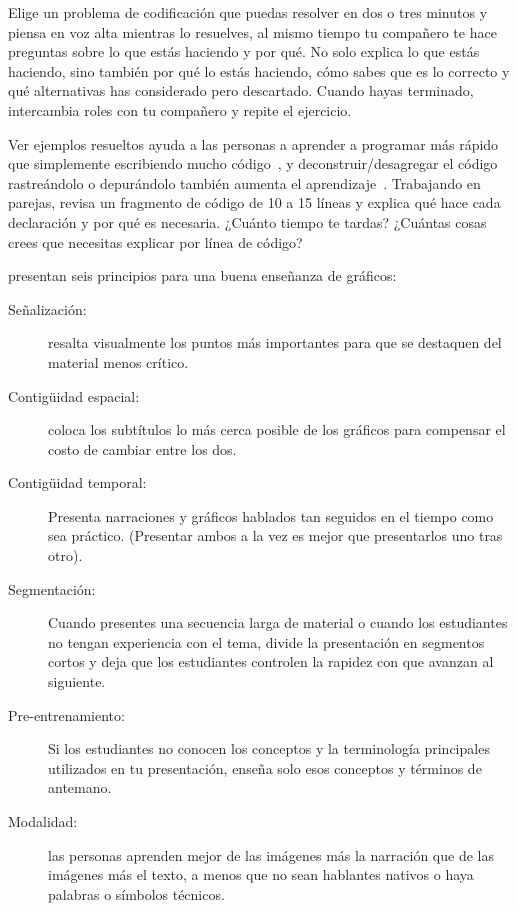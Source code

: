 Elige un problema de codificación que puedas resolver en dos o tres minutos
y piensa en voz alta mientras lo resuelves,
al mismo tiempo tu compañero te hace preguntas sobre lo que estás haciendo y por qué.
No solo explica lo que estás haciendo,
sino también por qué lo estás haciendo,
cómo sabes que es lo correcto y qué alternativas has considerado pero descartado.
Cuando hayas terminado,
intercambia roles con tu compañero y repite el ejercicio.



Ver ejemplos resueltos ayuda a las personas a aprender a programar más rápido que simplemente escribiendo mucho código~\cite{Skud2014},
y deconstruir/desagregar el código rastreándolo o depurándolo también aumenta el aprendizaje~\cite{Grif2016}.
Trabajando en parejas, revisa un fragmento de código de 10 a 15 líneas
y explica qué hace cada declaración y por qué es necesaria.
¿Cuánto tiempo te tardas?
¿Cuántas cosas crees que necesitas explicar por línea de código?


\cite{Maye2009,Mill2016a} presentan seis principios para una buena enseñanza de gráficos:

\begin{description}

\item[Señalización:]
  resalta visualmente los puntos más importantes
  para que se destaquen del material menos crítico.

\item[Contigüidad espacial:]
  coloca los subtítulos lo más cerca posible de los gráficos para compensar el costo de cambiar entre los dos.

\item[Contigüidad temporal:]
  Presenta narraciones y gráficos hablados tan seguidos en el tiempo como sea práctico.
  (Presentar ambos a la vez es mejor que presentarlos uno tras otro).

\item[Segmentación:]
  Cuando presentes una secuencia larga de material o
  cuando los estudiantes no tengan experiencia con el tema,
  divide la presentación en segmentos cortos y deja que los estudiantes controlen la rapidez con que avanzan al siguiente.

\item[Pre-entrenamiento:]
  Si los estudiantes no conocen los conceptos y la terminología principales utilizados en tu presentación,
  enseña solo esos conceptos y términos de antemano.

\item[Modalidad:]
las personas aprenden mejor de las imágenes más la narración que de las imágenes más el texto,
a menos que no sean hablantes nativos o haya palabras o símbolos técnicos.

\end{description}

